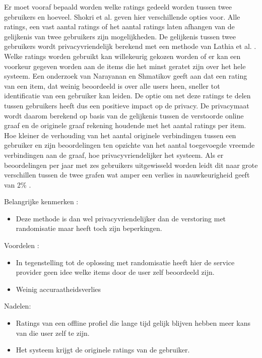 Er moet vooraf bepaald worden welke ratings gedeeld worden tussen twee gebruikers en hoeveel. Shokri et al. geven hier verschillende opties voor. Alle ratings, een vast aantal ratings of het aantal ratings laten afhangen van de gelijkenis van twee gebruikers zijn mogelijkheden. De gelijkenis tussen twee gebruikers wordt privacyvriendelijk berekend met een methode van Lathia et al. \cite{lath}. Welke ratings worden gebruikt kan willekeurig gekozen worden of er kan een voorkeur gegeven worden aan de items die het minst geratet zijn over het hele systeem. Een onderzoek van Narayanan en Shmatikov \cite{Narayanan2008} geeft aan dat een rating van een item, dat weinig beoordeeld is over alle users heen, sneller tot identificatie van een gebruiker kan leiden.  De optie om net deze ratings te delen tussen gebruikers heeft dus een positieve impact op de privacy. De privacymaat wordt daarom berekend op basis van de gelijkenis tussen de verstoorde online graaf en de originele graaf rekening houdende met het aantal ratings per item. Hoe kleiner de verhouding van het aantal originele verbindingen tussen een gebruiker en zijn beoordelingen ten opzichte van het aantal toegevoegde vreemde verbindingen aan de graaf, hoe privacyvriendelijker het systeem. Als er beoordelingen per jaar met zes gebruikers uitgewisseld worden leidt dit naar grote verschillen tussen de twee grafen wat amper een verlies in nauwkeurigheid geeft van 2\% . 


Belangrijke kenmerken :
\begin{itemize}
 
\item Deze methode is dan wel privacyvriendelijker dan de verstoring met randomisatie maar heeft toch zijn beperkingen.
\end{itemize}
Voordelen : 
\begin{itemize}
\item In tegenstelling tot de oplossing met randomisatie heeft hier de service provider geen idee welke items door de user zelf beoordeeld zijn. 
\item Weinig accuraatheidsverlies
\end{itemize}
Nadelen:
\begin{itemize}
\item Ratings van een offline profiel die lange tijd gelijk blijven hebben meer kans van die user zelf te zijn.
\item Het systeem krijgt de originele ratings van de gebruiker.

\end{itemize}
